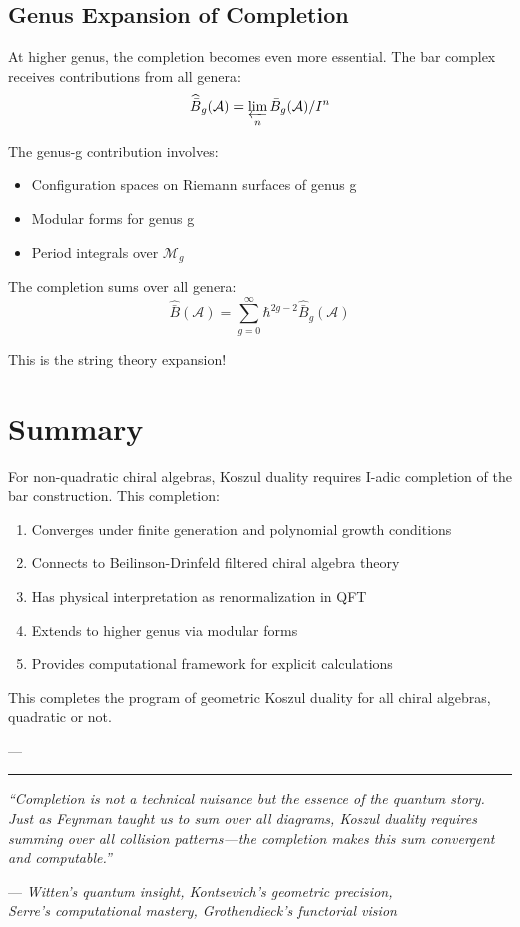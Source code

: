 \subsection{Genus Expansion of Completion}

\begin{remark}\label{rem:genus-completion}
At higher genus, the completion becomes even more essential. The bar complex receives contributions from all genera:
$$\widehat{\bar{B}}_g(\mathcal{A}) = \varprojlim_n \bar{B}_g(\mathcal{A})/I^n$$

The genus-g contribution involves:
\begin{itemize}
\item Configuration spaces on Riemann surfaces of genus g
\item Modular forms for genus g
\item Period integrals over $\mathcal{M}_g$
\end{itemize}

The completion sums over all genera:
$$\widehat{\bar{B}}(\mathcal{A}) = \sum_{g=0}^{\infty} \hbar^{2g-2} \widehat{\bar{B}}_g(\mathcal{A})$$

This is the string theory expansion!
\end{remark}

\section{Summary}

\begin{theorem}\label{thm:nilpotent-main}
For non-quadratic chiral algebras, Koszul duality requires I-adic completion of the bar construction. This completion:
\begin{enumerate}
\item Converges under finite generation and polynomial growth conditions
\item Connects to Beilinson-Drinfeld filtered chiral algebra theory
\item Has physical interpretation as renormalization in QFT
\item Extends to higher genus via modular forms
\item Provides computational framework for explicit calculations
\end{enumerate}

This completes the program of geometric Koszul duality for all chiral algebras, quadratic or not.
\end{theorem}

---

\begin{center}
\rule{0.5\textwidth}{0.4pt}

\textit{``Completion is not a technical nuisance but the essence of the quantum story. Just as Feynman taught us to sum over all diagrams, Koszul duality requires summing over all collision patterns—the completion makes this sum convergent and computable.''}

— \textit{Witten's quantum insight, Kontsevich's geometric precision, \\Serre's computational mastery, Grothendieck's functorial vision}
\end{center}

